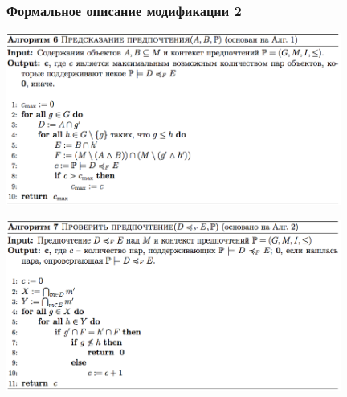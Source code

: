 \documentclass[xcolor=table,handout]{beamer}
\theoremstyle{definition}
\begin{document}
	\begin{frame}[allowframebreaks]
		\frametitle{Формальное описание модификации 2}
		\begin{center}
			\includegraphics[width=110mm]{./images/algo6.png}
		\end{center}
		\begin{center}
			\includegraphics[width=110mm]{./images/algo7.png}
		\end{center}
	\end{frame}
	
\end{document}
